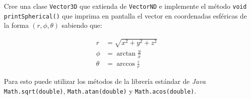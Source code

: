   \begin{exercise}
    Cree una clase \texttt{Vector3D} que extienda de \texttt{VectorND} e implemente el 
    método \texttt{void printSpherical()} que imprima en pantalla el vector en 
    coordenadas esféricas de la forma \((r, \phi, \theta)\) sabiendo que:
    
    \[
      \begin{aligned}
        r       &= \sqrt{x^2 + y^2 + z^2} \\
        \phi    &= \arctan{\frac{y}{x}}   \\
        \theta  &= \arccos{\frac{z}{r}}
      \end{aligned}
    \]

    Para esto puede utilizar los métodos de la librería estándar de \textit{Java} 
    \texttt{Math.sqrt(double)}, \texttt{Math.atan(double)} y 
    \texttt{Math.acos(double)}.
  \end{exercise}
%